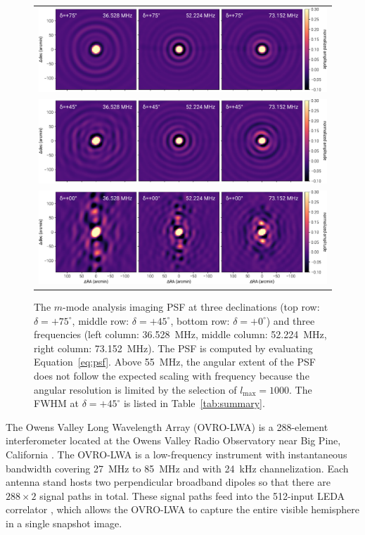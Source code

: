 \documentclass[twocolumn]{aastex61}
\begin{document}
\begin{figure}[t]
    \begin{tabular}{c}
        \includegraphics[width=\textwidth]{figures/psf/psf+75} \\
        \includegraphics[width=\textwidth]{figures/psf/psf+45} \\
        \includegraphics[width=\textwidth]{figures/psf/psf+0} \\
    \end{tabular}
    \caption{
        The $m$-mode analysis imaging PSF at three declinations (top row: $\delta=+75^\circ$, middle
        row: $\delta=+45^\circ$, bottom row: $\delta=+0^\circ$) and three frequencies (left column:
        36.528~MHz, middle column: 52.224~MHz, right column: 73.152~MHz).  The PSF is computed by
        evaluating Equation~\ref{eq:psf}. Above 55~MHz, the angular extent of the PSF does not
        follow the expected scaling with frequency because the angular resolution is limited by the
        selection of $l_\text{max}=1000$. The FWHM at $\delta=+45^\circ$ is listed in
        Table~\ref{tab:summary}.
    }
    \label{fig:psf}
\end{figure}

The Owens Valley Long Wavelength Array (OVRO-LWA) is a 288-element interferometer located at the
Owens Valley Radio Observatory near Big Pine, California \citep{hallinan_2017}.  The OVRO-LWA is a
low-frequency instrument with instantaneous bandwidth covering 27~MHz to 85~MHz and with 24~kHz
channelization.  Each antenna stand hosts two perpendicular broadband dipoles so that there are
$288\times2$ signal paths in total. These signal paths feed into the 512-input LEDA correlator
\citep{2015JAI.....450003K}, which allows the OVRO-LWA to capture the entire visible hemisphere in a
single snapshot image.
\end{document}
